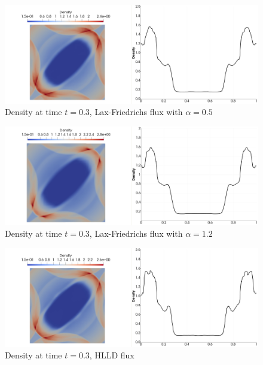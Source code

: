 	
	\begin{figure}[H]
		\begin{center}
			\includegraphics[width=\textwidth]{img/numflux/lf-05-2.jpg}
			\vspace{-3mm}
		\caption{Density at time $t = 0.3$, Lax-Friedrichs flux with $\alpha = 0.5$}
		\end{center}
		\label{numFluxCompare6}
	\end{figure}\vspace{-7mm}
	\begin{figure}[H]
		\begin{center}
			\includegraphics[width=\textwidth]{img/numflux/lf-10-2.jpg}
			\vspace{-3mm}
		\caption{Density at time $t = 0.3$, Lax-Friedrichs flux with $\alpha = 1.2$}
		\end{center}
		\label{numFluxCompare7}
	\end{figure}\vspace{-7mm}
	\begin{figure}[H]
		\begin{center}
			\includegraphics[width=\textwidth]{img/numflux/hl-2.jpg}
			\vspace{-3mm}
		\caption{Density at time $t = 0.3$, HLLD flux}
		\end{center}
		\label{numFluxCompare8}
	\end{figure}\vspace{-7mm}
	\newpage
	
